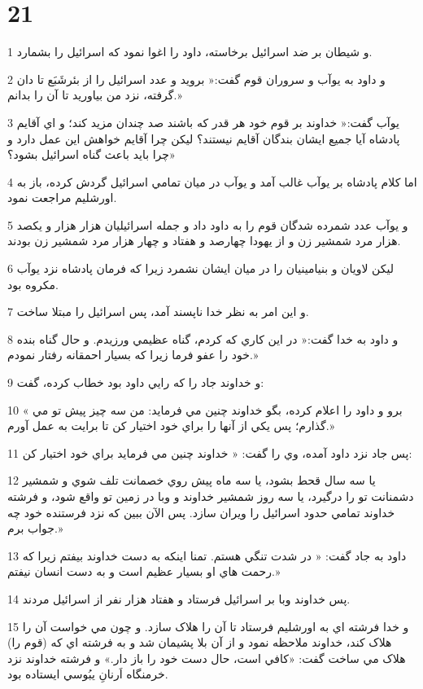 \chapter{21}

\par 1 و شيطان بر ضد اسرائيل برخاسته، داود را اغوا نمود که اسرائيل را بشمارد.
\par 2 و داود به يوآب و سروران قوم گفت:« برويد و عدد اسرائيل را از بئرشَبَع تا دان گرفته، نزد من بياوريد تا آن را بدانم.»
\par 3 يوآب گفت:« خداوند بر قوم خود هر قدر که باشند صد چندان مزيد کند؛ و اي آقايم پادشاه آيا جميع ايشان بندگان آقايم نيستند؟ ليکن چرا آقايم خواهش اين عمل دارد و چرا بايد باعث گناه اسرائيل بشود؟»
\par 4 اما کلام پادشاه بر يوآب غالب آمد و يوآب در ميان تمامي اسرائيل گردش کرده، باز به اورشليم مراجعت نمود.
\par 5 و يوآب عدد شمرده شدگان قوم را به داود داد و جمله اسرائيليان هزار هزار و يکصد هزار مرد شمشير زن و از يهودا چهارصد و هفتاد و چهار هزار مرد شمشير زن بودند.
\par 6 ليکن لاويان و بنيامينيان را در ميان ايشان نشمرد زيرا که فرمان پادشاه نزد يوآب مکروه بود.
\par 7 و اين امر به نظر خدا ناپسند آمد، پس اسرائيل را مبتلا ساخت.
\par 8 و داود به خدا گفت:« در اين کاري که کردم، گناه عظيمي ورزيدم. و حال گناه بنده خود را عفو فرما زيرا که بسيار احمقانه رفتار نمودم.»
\par 9 و خداوند جاد را که رايي داود بود خطاب کرده، گفت:
\par 10 « برو و داود را اعلام کرده، بگو خداوند چنين مي فرمايد: من سه چيز پيش تو مي گذارم؛ پس يکي از آنها را براي خود اختيار کن تا برايت به عمل آورم.»
\par 11 پس جاد نزد داود آمده، وي را گفت: « خداوند چنين مي فرمايد براي خود اختيار کن:
\par 12 يا سه سال قحط بشود، يا سه ماه پيش روي خصمانت تلف شوي و شمشير دشمنانت تو را درگيرد، يا سه روز شمشير خداوند و وبا در زمين تو واقع شود، و فرشته خداوند تمامي حدود اسرائيل را ويران سازد. پس الآن ببين که نزد فرستنده خود چه جواب برم.»
\par 13 داود به جاد گفت: « در شدت تنگي هستم. تمنا اينکه به دست خداوند بيفتم زيرا که رحمت هاي او بسيار عظيم است و به دست انسان نيفتم.»
\par 14 پس خداوند وبا بر اسرائيل فرستاد و هفتاد هزار نفر از اسرائيل مردند.
\par 15 و خدا فرشته اي به اورشليم فرستاد تا آن را هلاک سازد. و چون مي خواست آن را هلاک کند، خداوند ملاحظه نمود و از آن بلا پشيمان شد و به فرشته اي که (قوم را) هلاک مي ساخت گفت: «کافي است، حال دست خود را باز دار.» و فرشته خداوند نزد خرمنگاه اَرنانِ يبُوسي ايستاده بود.
